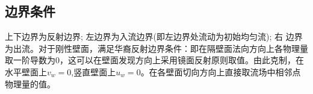 \documentclass[12pt]{article}
\begin{document}
\subsection{边界条件}

上下边界为反射边界; 左边界为入流边界(即左边界处流动为初始均匀流); 右 边界为出流。对于刚性壁面，满足华裔反射边界条件：即在隔壁面法向方向上各物理量取一阶导数为0，这可以在壁面发现方向上采用镜面反射原则取值。由此克制，在水平壁面上$v_w=0$,竖直壁面上$u_w=0$。在各壁面切向方向上直接取流场中相邻点物理量的值。\cite[P339]{cfd}













\end{document}
